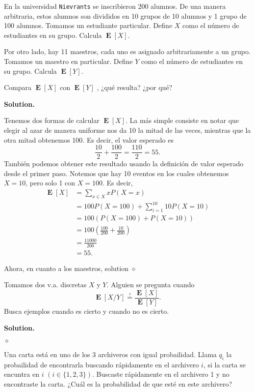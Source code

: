 \documentclass{article}
\theoremstyle{problemstyle}
\newenvironment{solution}{%
  \begin{mdframed}[linewidth=0.8pt,linecolor=Gray,backgroundcolor=Gray!5,roundcorner=5pt, nobreak=true]%
  \noindent\textbf{Solution.}%
}{%
\hfill $ \diamond $ 
  \end{mdframed}%
}
\DeclareMathOperator{\E}{\mathbf{E}}
\begin{document}
\begin{problem}
En la universidad \texttt{Nievrants} se inscribieron 200 alumnos. De una manera
arbitraria, estos alumnos son divididos en 10 grupos de 10 alumnos y 1
grupo de 100 alumnos. Tomamos un estudiante particular. Define $ X $ como
el n\'umero de estudiantes en su grupo. Calcula $\E[X]$.

Por otro lado, hay 11 maestros, cada uno es asignado arbitrariamente a
un grupo. Tomamos un maestro en particular. Define $ Y $ como el n\'umero
de estudiantes en su grupo. Calcula $ \E[Y] $.

Compara $\E[X]$ con $\E[Y]$ , ¿qu\'e resulta? ¿por qu\'e?
\end{problem}
\begin{solution}
	Tenemos dos formas de calcular $ \E[X] $. La m\'as simple consiste en notar que elegir al azar de manera uniforme nos da 10 la mitad de las veces, mientras que la otra mitad obtenemos 100. Es decir, el valor esperado es
	\[
		\frac{10}{2} + \frac{100}{2} = \frac{110}{2} = 55.
	\]
	Tambi\'en podemos obtener este resultado usando la definici\'on de valor esperado desde el primer paso. Notemos que hay 10 eventos en los cuales obtenemos $ X = 10 $, pero solo 1 con $ X = 100 $. Es decir,
  \begin{align*}
    \E[X] &= \sum_{x\in X} x P(X=x) \\ 
          &= 100 P(X=100) + \sum_{i = 1}^{10} 10 P(X = 10)\\
          &= 100 (P(X=100) + P(X = 10))\\
          &= 100\left(\frac{100}{200} + \frac{10}{200}\right) \\
          &= \frac{11000}{200} \\
          &= 55.
  \end{align*}
  

  Ahora, en cuanto a los maestros, solution
\end{solution}

\begin{problem}
Tomamos dos v.a. discretas $ X $ y $ Y $. Alguien se pregunta cuando
\[
	\E[X/Y]\stackrel{?}{=}\frac{\E[X]}{\E[Y]}.
\]
Busca ejemplos cuando es cierto y cuando no es cierto.
\end{problem}
\begin{solution}

\end{solution}

\begin{problem}
Una carta est\'a en uno de los 3 archiveros con igual probailidad. Llama $ q_i $ la probailidad de encontrarla buscando r\'apidamente en el archivero $ i $, si la carta se encuntra en $ i $ $ (i \in \{1,2,3\}) $. Buscaste r\'apidamente en el archivero 1 y no encontraste la carta. ¿Cu\'al es la probabilidad de que est\'e en este archivero?

\end{problem}
\end{document}
